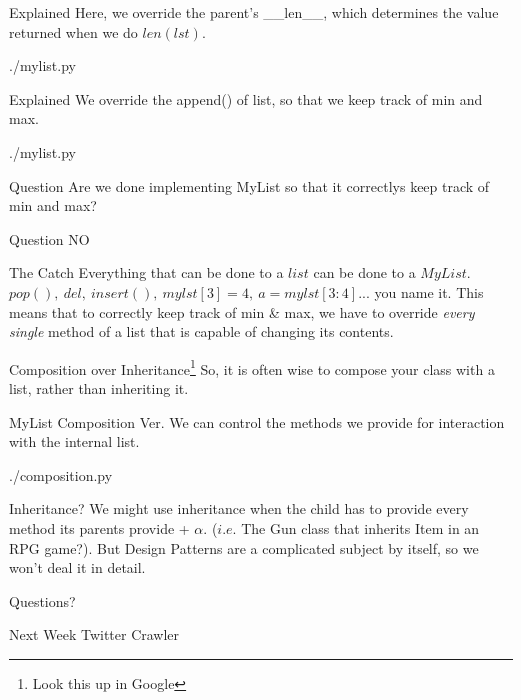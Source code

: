 \documentclass{beamer}
\begin{document}
\begin{frame}{Explained}
  Here, we override the parent's \_\_len\_\_, which determines the value
  returned when we do $len(lst)$.
  \begin{lstinputlisting}[firstline=8, lastline=10]
    {./mylist.py}
  \end{lstinputlisting}
\end{frame}

\begin{frame}{Explained}
  We override the append() of list, so that we keep track of min and max.
  \begin{lstinputlisting}[firstline=12, lastline=17]
    {./mylist.py}
  \end{lstinputlisting}
\end{frame}

\begin{frame}{Question}
  Are we done implementing MyList so that it correctlys keep track of min and max?
\end{frame}

\begin{frame}{Question}
  NO
\end{frame}

\begin{frame}{The Catch}
  Everything that can be done to a $list$ can be done to a $MyList$.\\
  $pop(),\ del,\ insert(),\ mylst[3]=4,\ a = mylst[3:4]$... you name it. This means that to
  correctly keep track of min \& max, we have to override \textit{every single} method of a list
  that is capable of changing its contents.
\end{frame}

\begin{frame}{Composition over Inheritance\footnote{Look this up in Google}}
    So, it is often wise to compose your class with a list, rather than inheriting
    it.
\end{frame}

\begin{frame}{MyList Composition Ver.}
  We can control the methods we provide for interaction with the internal list.
  \begin{lstinputlisting}[firstline=1, lastline=23]
    {./composition.py}
  \end{lstinputlisting}
\end{frame}

\begin{frame}{Inheritance?}
  We might use inheritance when the child has to provide every method its parents
  provide + $\alpha$. ($i.e.$ The Gun class that inherits Item in an RPG
  game?). But Design Patterns are a complicated subject by itself, so we won't
  deal it in detail.
\end{frame}

\begin{frame}{Questions?}
\end{frame}

\begin{frame}{Next Week}
  Twitter Crawler
\end{frame}
\end{document}
